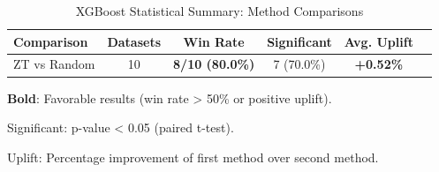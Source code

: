 \begin{table}[htbp]
\centering
\caption{XGBoost Statistical Summary: Method Comparisons}
\label{tab:xgboost_stats_summary}
\begin{tabular}{lccccc}
\toprule
Comparison & Datasets & Win Rate & Significant & Avg. Uplift \\
\midrule
ZT vs Random & 10 & \textbf{8/10 (80.0\%)} & 7 (70.0\%) & \textbf{+0.52\%} \\
\bottomrule
\end{tabular}
\begin{tablenotes}
\small
\item \textbf{Bold}: Favorable results (win rate > 50\% or positive uplift).
\item Significant: p-value < 0.05 (paired t-test).
\item Uplift: Percentage improvement of first method over second method.
\end{tablenotes}
\end{table}